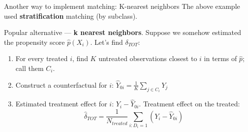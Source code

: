 \documentclass[beamer,compress]{beamer}
\begin{document}
\begin{frame}{Another way to implement matching: K-nearest neighbors}
	The above example used \textbf{stratification} matching (by subclass).\\\bigskip
	
	Popular alternative --- \textbf{k nearest neighbors}. Suppose we somehow estimated the propensity score $\widehat{p}(X_i)$. Let's find $\delta_{TOT}$:	
	\begin{enumerate}
		\item{For every treated $i$, find $K$ untreated observations closest to $i$ in terms of $\widehat{p}$; call them $C_i$.}
		\item{Construct a counterfactual for $i$: $\widehat{Y}_{0i} = \frac{1}{K}\sum\limits_{j\in{}C_i}Y_j$}
		\item{Estimated treatment effect for $i$: $Y_i - \widehat{Y}_{0i}$. Treatment effect on the treated:
		\begin{equation*}
			\widehat{\delta}_{TOT} = \frac{1}{N_{treated}}\sum\limits_{i:D_i=1}\left(Y_i - \widehat{Y}_{0i}\right)
		\end{equation*}}
	\end{enumerate}
		
\end{frame}
\end{document}
